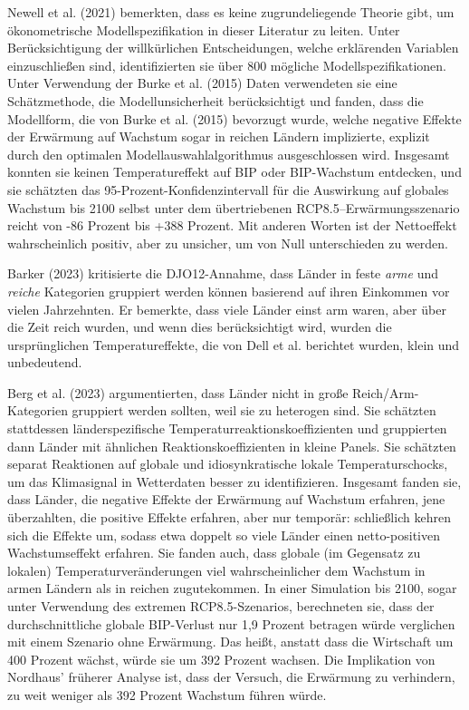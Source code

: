 \documentclass[12pt,paper=a4,DIV=12,parskip=never,chapterprefix=false,headings=standardclasses]{scrreprt}
\begin{document}
Newell et al. (2021) bemerkten, dass es keine zugrundeliegende Theorie gibt, um ökonometrische Modellspezifikation in dieser Literatur zu leiten. Unter Berücksichtigung der willkürlichen Entscheidungen, welche erklärenden Variablen einzuschließen sind, identifizierten sie über 800 mögliche Modellspezifikationen. Unter Verwendung der Burke et al. (2015) Daten verwendeten sie eine Schätzmethode, die Modellunsicherheit berücksichtigt und fanden, dass die Modellform, die von Burke et al. (2015) bevorzugt wurde, welche negative Effekte der Erwärmung auf Wachstum sogar in reichen Ländern implizierte, explizit durch den optimalen Modellauswahlalgorithmus ausgeschlossen wird. Insgesamt konnten sie keinen Temperatureffekt auf BIP oder BIP-Wachstum entdecken, und sie schätzten das 95-Prozent-Konfidenzintervall für die Auswirkung auf globales Wachstum bis 2100 selbst unter dem übertriebenen RCP8.5--Erwärmungsszenario reicht von -86 Prozent bis +388 Prozent. Mit anderen Worten ist der Nettoeffekt wahrscheinlich positiv, aber zu unsicher, um von Null unterschieden zu werden.

Barker (2023) kritisierte die DJO12-Annahme, dass Länder in feste \emph{arme} und \emph{reiche} Kategorien gruppiert werden können basierend auf ihren Einkommen vor vielen Jahrzehnten. Er bemerkte, dass viele Länder einst arm waren, aber über die Zeit reich wurden, und wenn dies berücksichtigt wird, wurden die ursprünglichen Temperatureffekte, die von Dell et al. berichtet wurden, klein und unbedeutend.

Berg et al. (2023) argumentierten, dass Länder nicht in große Reich/Arm-Kategorien gruppiert werden sollten, weil sie zu heterogen sind. Sie schätzten stattdessen länderspezifische Temperaturreaktionskoeffizienten und gruppierten dann Länder mit ähnlichen Reaktionskoeffizienten in kleine Panels. Sie schätzten separat Reaktionen auf globale und idiosynkratische lokale Temperaturschocks, um das Klimasignal in Wetterdaten besser zu identifizieren. Insgesamt fanden sie, dass Länder, die negative Effekte der Erwärmung auf Wachstum erfahren, jene überzahlten, die positive Effekte erfahren, aber nur temporär: schließlich kehren sich die Effekte um, sodass etwa doppelt so viele Länder einen netto-positiven Wachstumseffekt erfahren. Sie fanden auch, dass globale (im Gegensatz zu lokalen) Temperaturveränderungen viel wahrscheinlicher dem Wachstum in armen Ländern als in reichen zugutekommen.
In einer Simulation bis 2100, sogar unter Verwendung des extremen RCP8.5-Szenarios, berechneten sie, dass der durchschnittliche globale BIP-Verlust nur 1,9 Prozent betragen würde verglichen mit einem Szenario ohne Erwärmung. Das heißt, anstatt dass die Wirtschaft um 400 Prozent wächst, würde sie um 392 Prozent wachsen. Die Implikation von Nordhaus' früherer Analyse ist, dass der Versuch, die Erwärmung zu verhindern, zu weit weniger als 392 Prozent Wachstum führen würde.
\end{document}
